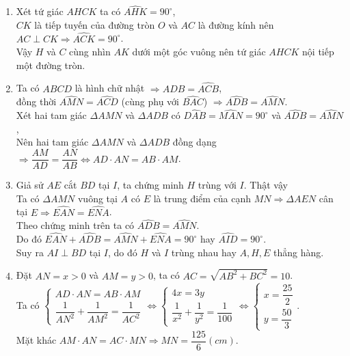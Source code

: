 \begin{bt}
{\begin{enumerate}
			\item Xét tứ giác $AHCK$ ta có $\widehat{AHK} = 90^{\circ}$,\\
$CK$ là tiếp tuyến của đường tròn $O$ và $AC$ là đường kính nên $AC \perp CK \Rightarrow \widehat{ACK} = 90^{\circ}$.\\
Vậy $H$ và $C$ cùng nhìn $AK$ dưới một góc vuông nên tứ giác $AHCK$ nội tiếp một đường tròn.
			\item Ta có $ABCD$ là hình chữ nhật $\Rightarrow \widehat{ADB} = \widehat{ACB}$,\\
đồng thời $\widehat{AMN} = \widehat{ACD}$ (cùng phụ với $\widehat{BAC}$) $\Rightarrow \widehat{ADB} = \widehat{AMN}$.\\
Xét hai tam giác $\Delta AMN$ và $\Delta ADB$ có $\widehat{DAB} = \widehat{MAN} = 90^{\circ}$ và $\widehat{ADB} = \widehat{AMN}$,\\
Nên hai tam giác $\Delta AMN$ và $\Delta ADB$ đồng dạng $\Rightarrow \dfrac{AM}{AD} = \dfrac{AN}{AB} \Leftrightarrow AD\cdot AN = AB\cdot AM$.
             \item Giả sử $AE$ cắt $BD$ tại $I$, ta chứng minh $H$ trùng với $I$. Thật vậy\\
Ta có $\Delta AMN$ vuông tại $A$ có $E$ là trung điểm của cạnh $MN \Rightarrow \Delta AEN$ cân tại $E \Rightarrow \widehat{EAN} = \widehat{ENA}$.\\
Theo chứng minh trên ta có $\widehat{ADB} = \widehat{AMN}$.\\
Do đó $\widehat{EAN} + \widehat{ADB} = \widehat{AMN} + \widehat{ENA} = 90^{\circ}$ hay $\widehat{AID} = 90^{\circ}$.\\
Suy ra $AI \perp BD$ tại $I$, do đó $H$ và $I$ trùng nhau hay $A, H, E$ thẳng hàng.
			\item Đặt $AN = x > 0$ và $AM = y > 0$, ta có $AC = \sqrt{AB^2 + BC^2} = 10$.\\
Ta có $\begin{cases} AD\cdot AN = AB\cdot AM \\ \dfrac{1}{AN^2} + \dfrac{1}{AM^2} = \dfrac{1}{AC^2}\end{cases} \Leftrightarrow \begin{cases} 4x = 3y \\ \dfrac{1}{x^2} + \dfrac{1}{y^2}  = \dfrac{1}{100}\end{cases} \Leftrightarrow \begin{cases} x = \dfrac{25}{2} \\ y = \dfrac{50}{3} \end{cases}$.\\
Mặt khác $AM \cdot AN = AC\cdot MN \Rightarrow MN = \dfrac{125}{6} (cm)$.
		\end{enumerate}	}
\end{bt}
